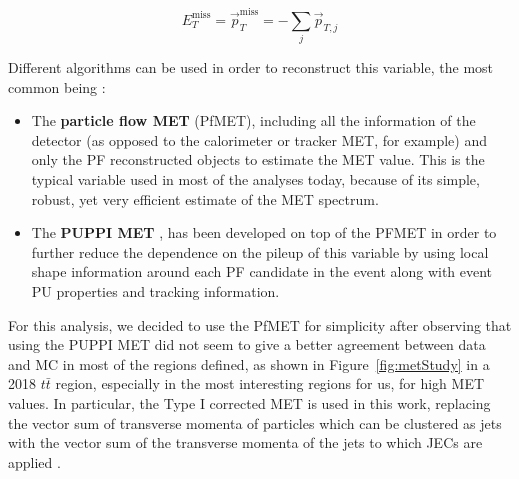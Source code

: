 \documentclass[a4paper, 10pt, openright]{report}
\begin{document}
\begin{equation}
\label{eq:MET}
E_{T}^{\text{miss}} = \overrightarrow{p}_T^{\text{miss}} = - \sum_j \overrightarrow{p}_{T, j}
\end{equation}

Different algorithms can be used in order to reconstruct this variable, the most common being \cite{METReco}:
\begin{itemize}
\item The \textbf{particle flow \ac{MET}} (PfMET), including all the information of the detector (as opposed to the calorimeter or tracker \ac{MET}, for example) and only the \ac{PF} reconstructed objects to estimate the \ac{MET} value. This is the typical variable used in most of the analyses today, because of its simple, robust, yet very efficient estimate of the \ac{MET} spectrum.
\item The \textbf{\ac{PUPPI} \ac{MET}} \cite{PUPPI}, has been developed on top of the PFMET in order to further reduce the dependence on the pileup of this variable by using local shape information around each \ac{PF} candidate in the event along with event \ac{PU} properties and tracking information. %
\end{itemize}

For this analysis, we decided to use the PfMET for simplicity after observing that using the \ac{PUPPI} \ac{MET} did not seem to give a better agreement between data and \ac{MC} in most of the regions defined, as shown in Figure~\ref{fig:metStudy} in a 2018 $t \bar t$ region, especially in the most interesting regions for us, for high \ac{MET} values. In particular, the Type I corrected \ac{MET} is used in this work, replacing the vector sum of transverse momenta of particles which can be clustered as jets with the vector sum of the transverse momenta of the jets to which \acp{JEC} are applied \cite{METTwiki}.
\end{document}
